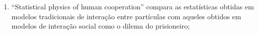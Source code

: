 \begin{enumerate}
\item ``Statistical physics of human cooperation'' compara as estatísticas obtidas em modelos tradicionais de interação entre partículas com aqueles obtidos em modelos de interação social como o dilema do prisioneiro;%

\end{enumerate}
